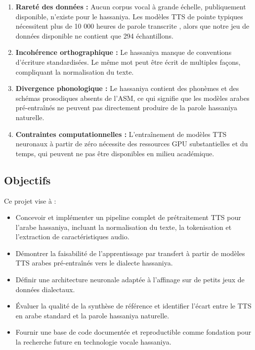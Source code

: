 \documentclass[12pt,a4paper]{article}
\begin{document}
\begin{enumerate}[label=(\roman*)]
    \item \textbf{Rareté des données :} Aucun corpus vocal à grande échelle, publiquement disponible, n'existe pour le hassaniya. Les modèles TTS de pointe typiques nécessitent plus de 10 000 heures de parole transcrite \citep{shen2018natural}, alors que notre jeu de données disponible ne contient que 294 échantillons.
    \item \textbf{Incohérence orthographique :} Le hassaniya manque de conventions d'écriture standardisées. Le même mot peut être écrit de multiples façons, compliquant la normalisation du texte.
    \item \textbf{Divergence phonologique :} Le hassaniya contient des phonèmes et des schémas prosodiques absents de l'ASM, ce qui signifie que les modèles arabes pré-entraînés ne peuvent pas directement produire de la parole hassaniya naturelle.
    \item \textbf{Contraintes computationnelles :} L'entraînement de modèles TTS neuronaux à partir de zéro nécessite des ressources GPU substantielles et du temps, qui peuvent ne pas être disponibles en milieu académique.
\end{enumerate}

\subsection{Objectifs}

Ce projet vise à :

\begin{itemize}
    \item Concevoir et implémenter un pipeline complet de prétraitement TTS pour l'arabe hassaniya, incluant la normalisation du texte, la tokenisation et l'extraction de caractéristiques audio.
    \item Démontrer la faisabilité de l'apprentissage par transfert à partir de modèles TTS arabes pré-entraînés vers le dialecte hassaniya.
    \item Définir une architecture neuronale adaptée à l'affinage sur de petits jeux de données dialectaux.
    \item Évaluer la qualité de la synthèse de référence et identifier l'écart entre le TTS en arabe standard et la parole hassaniya naturelle.
    \item Fournir une base de code documentée et reproductible comme fondation pour la recherche future en technologie vocale hassaniya.
\end{itemize}
\end{document}
